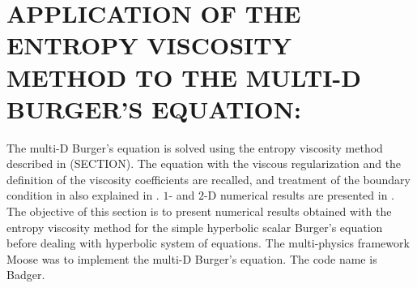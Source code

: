 %
%
%

\chapter{\uppercase {Application of the entropy viscosity method to the multi-D Burger's equation:}}
The multi-D Burger's equation is solved using the entropy viscosity method described in (SECTION). The equation with the viscous regularization and the definition of the viscosity coefficients are recalled, and treatment of the boundary condition in also explained in . $1$- and $2$-D numerical results are presented in . The objective of this section is to present numerical results obtained with the entropy viscosity method for the simple hyperbolic scalar Burger's equation before dealing with hyperbolic system of equations. The multi-physics framework Moose \cite{moose} was to implement the multi-D Burger's equation. The code name is Badger.
